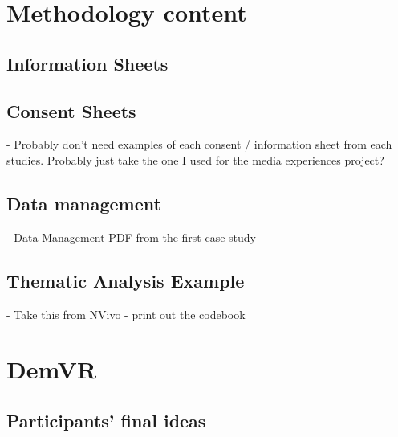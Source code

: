 
\chapter{Methodology content}
\section{Information Sheets}
\label{app:infoSheets}

\section{Consent Sheets}
\label{app:ConSheets}
- Probably don't need examples of each consent / information sheet from each studies. Probably just take the one I used for the media experiences project?

\section{Data management}
\label{app:DataManagement}
- Data Management PDF from the first case study

\section{Thematic Analysis Example}
\label{app:TA}
- Take this from NVivo - print out the codebook
\chapter{DemVR}
\section{Participants' final ideas}
\label{sec:EventIdeas}

